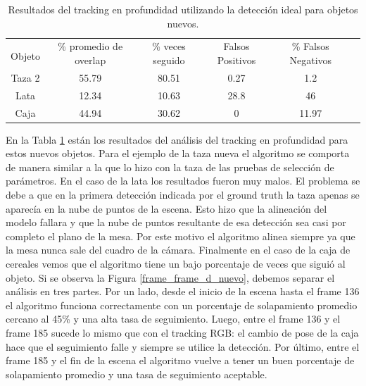 \begin{table}[h]
    \begin{tabular}{|c|c|c|c|c|c|}
    \hline
    & \multirow{2}{2.4cm}{\% promedio de overlap} & \multirow{2}{2cm}{\% veces seguido} & \multirow{2}{1.6cm}{Falsos Positivos} & \multirow{2}{1.6cm}{\% Falsos Negativos}\\
	Objeto & & & &\\
    \hline
    Taza 2  & 55.79      & 80.51     & 0.27     &   1.2 \\
    \hline
    Lata    & 12.34      & 10.63     & 28.8     &    46 \\
    \hline
    Caja    & 44.94      & 30.62     & 0        & 11.97 \\
    \hline
    \end{tabular}
\caption{Resultados del tracking en profundidad utilizando la detección ideal para objetos nuevos.}
\label{tabla_d_nuevos}
\end{table}

En la Tabla \ref{tabla_d_nuevos} están los resultados del análisis del tracking en profundidad para estos nuevos objetos. Para el ejemplo de la taza nueva el algoritmo se comporta de manera similar a la que lo hizo con la taza de las pruebas de selección de parámetros. En el caso de la lata los resultados fueron muy malos. El problema se debe a que en la primera detección indicada por el ground truth la taza apenas se aparecía en la nube de puntos de la escena. Esto hizo que la alineación del modelo fallara y que la nube de puntos resultante de esa detección sea casi por completo el plano de la mesa. Por este motivo el algoritmo alinea siempre ya que la mesa nunca sale del cuadro de la cámara.
Finalmente en el caso de la caja de cereales vemos que el algoritmo tiene un bajo porcentaje de veces que siguió al objeto. Si se observa la Figura \ref{frame_frame_d_nuevo}, debemos separar el análisis en tres partes. Por un lado, desde el inicio de la escena hasta el frame 136 el algoritmo funciona correctamente con un porcentaje de solapamiento promedio cercano al 45\% y una alta tasa de seguimiento. Luego, entre el frame 136 y el frame 185 sucede lo mismo que con el tracking RGB: el cambio de pose de la caja hace que el seguimiento falle y siempre se utilice la detección. Por último, entre el frame 185 y el fin de la escena el algoritmo vuelve a tener un buen porcentaje de solapamiento promedio y una tasa de seguimiento aceptable.

